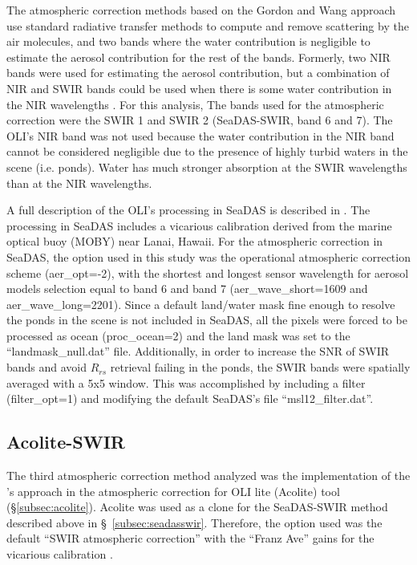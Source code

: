 
The atmospheric correction methods based on the Gordon and Wang approach use standard radiative transfer methods to compute and remove scattering by the air molecules, and two bands where the water contribution is negligible to estimate the aerosol contribution for the rest of the bands. Formerly, two NIR bands were used for estimating the aerosol contribution, but a combination of NIR and SWIR bands could be used when there is some water contribution in the NIR wavelengths \cite{Wang2009}. For this analysis, The bands used for the atmospheric correction were the SWIR 1 and SWIR 2 (SeaDAS-SWIR, band 6 and 7). The OLI's NIR band was not used because the water contribution in the NIR band cannot be considered negligible due to the presence of highly turbid waters in the scene (i.e. ponds). Water has much stronger absorption at the SWIR wavelengths than at the NIR wavelengths. 

A full description of the OLI's processing in SeaDAS is described in \cite{Franz:2015}. The processing in SeaDAS includes a vicarious calibration derived from the marine optical buoy (MOBY) near Lanai, Hawaii. For the atmospheric correction in SeaDAS, the option used in this study was the operational atmospheric correction scheme (aer\_opt=-2), with the shortest and longest sensor wavelength for aerosol models selection equal to band 6 and band 7 (aer\_wave\_short=1609 and aer\_wave\_long=2201). Since a default land/water mask fine enough to resolve the ponds in the scene is not included in SeaDAS, all the pixels were forced to be processed as ocean (proc\_ocean=2) and the land mask was set to the ``landmask\_null.dat'' file. Additionally, in order to increase the SNR of SWIR bands and avoid $R_{rs}$ retrieval failing in the ponds, the SWIR bands were spatially averaged with a 5x5 window. This was accomplished by including a filter (filter\_opt=1) and modifying the default SeaDAS's file ``msl12\_filter.dat''.
\subsection{Acolite-SWIR}
The third atmospheric correction method analyzed was the implementation of the \cite{Gordon:1994}'s approach in the atmospheric correction for OLI lite (Acolite) tool (\S\ref{subsec:acolite}). Acolite was used as a clone for the SeaDAS-SWIR method described above in \S~\ref{subsec:seadasswir}. Therefore, the option used was the default ``SWIR atmospheric correction'' with the ``Franz Ave'' gains for the vicarious calibration \cite{Franz:2015}.
